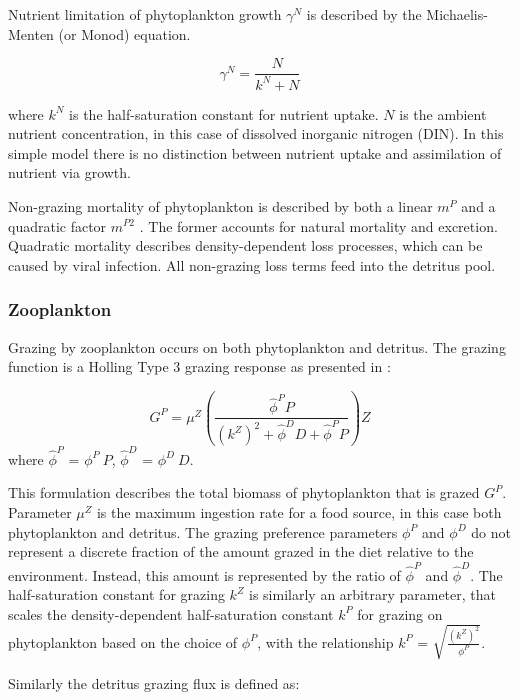 \documentclass[journal abbreviations, manuscript]{copernicus}
\begin{document}
Nutrient limitation of phytoplankton growth $\gamma^N$ is described by the Michaelis-Menten (or Monod) equation.

\begin{equation}
    \gamma^N = \frac{N}{k^N + N}
\end{equation}

where $k^N$ is the half-saturation constant for nutrient uptake. $N$ is the ambient nutrient concentration, in this case of dissolved inorganic nitrogen (DIN). In this simple model there is no distinction between nutrient uptake and assimilation of nutrient via growth.

Non-grazing mortality of phytoplankton is described by both a linear $m^P$ and a quadratic factor $m^{P2}$ \citep{Yool2011Medusa-1.0:Domain}. The former accounts for natural mortality and excretion. Quadratic mortality describes density-dependent loss processes, which can be caused by viral infection. All non-grazing loss terms feed into the detritus pool.

\subsubsection{Zooplankton}
Grazing by zooplankton occurs on both phytoplankton and detritus. The grazing function is a Holling Type 3 grazing response as presented in \citet{Anderson2015c}:

\begin{equation}
    G^P = \mu^Z \left( \frac{ \hat{\phi}^P P}{(k^Z)^2 + \hat{\phi}^D D +\hat{\phi}^P P}  \right) Z
\end{equation}
where $\hat{\phi}^P$ = $\phi^P \ P$, $\hat{\phi}^D$ = $\phi^D \ D$.

This formulation describes the total biomass of phytoplankton that is grazed $G^P$. Parameter $\mu^Z$ is the maximum ingestion rate for a food source, in this case both phytoplankton and detritus. 
The grazing preference parameters $\phi^P$ and $\phi^D$ do not represent a discrete fraction of the amount grazed in the diet relative to the environment. Instead, this amount is represented by the ratio of $\hat{\phi}^P$ and $\hat{\phi}^D$. 
The half-saturation constant for grazing $k^Z$ is similarly an arbitrary parameter, that scales the density-dependent half-saturation constant $k^P$ for grazing on phytoplankton based on the choice of $\phi^P$, with the relationship $k^P$ = $\sqrt{\frac{(k^Z)^2 }{ \phi^P}}$.


Similarly the detritus grazing flux is defined as:
\end{document}
